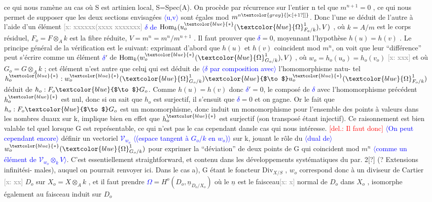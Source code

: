 \documentclass[11pt]{article}
\newcommand{\scanpage}[1]{\par\bigskip\noindent{\small\sffamily[scan #1]}\par}
\newcommand{\mspage}[1]{{\small\sffamily[p.\,#1]}}
\newcommand{\hand}[1]{\textcolor{blue}{#1}}
\let\over\relax
\newcommand{\over}[2]{\textcolor{gray}{#1}\textcolor{blue}{\ensuremath{^{\!\nearrow}}#2}}
\newcommand{\inserted}[2][]{\textcolor{blue}{$\langle$#2$\rangle$}}
\newcommand{\deleted}[1]{\textcolor{red}{[\textsf{del.:} #1]}}
\newcommand{\xout}[1]{\textcolor{gray}{[\textsf{x:} #1]}}
\newcommand{\uline}[1]{\underline{#1}}
\newcommand{\unsure}[1]{[#1?]}
\begin{document}
\mspage{129}

\clearpage
\scanpage{25/130}
\mspage{\hand{33}}

ce qui nous ramène au cas où S est artinien local, S=Spec(A). On procède
par récurrence sur l'entier n tel que $m^{n+1}=0$ , ce qui nous permet de
supposer que les deux sections envisagées \inserted{u,v} sont égales mod $m^{n\xout{\unsure{+1}}}$. Donc
l'une se déduit de l'autre à l'aide d'un élément \xout{xxxxxx(xxxx xxxxxxx} \hand{$\delta$ de}
$\mathrm{Hom}_k(u_o^{\hand{*}}(\hand{\Omega}^1_{F_o/k}), V)$ , où $k=A/m$ est le corps résiduel, $F_o=F\otimes_A k$ est la
fibre réduite, $V=m^n = m^n/m^{n+1}$ . Il faut prouver que \hand{$\delta$}$= 0$, moyennant
l'hypothèse $h(u)=h(v)$ . Le principe général de la vérification est le
suivant: exprimant d'abord que $h(u)$ et $h(v)$ coincident mod $m^n$, on voit
que leur ``différence'' peut s'écrire comme un élément \hand{$\delta$}$'$ de
$\mathrm{Hom}_k(w_o^{\hand{*}}(\hand{\Omega}^1_{G_o/k}),V)$ , où $w_o = h_o(u_o)=h_o(v_o)$ \xout{xxx} et où $G_o = G\otimes_A k$ ;
cet élément n'est autre que celu\uline{i} qui est déduit de \inserted[typed]{\hand{$\delta$} par composition avec} l'homomorphisme natu-%
tel $h_o^{\hand{*}} : w_o^{\hand{*}}(\hand{\Omega}^1_{G_o/k}) \hand{$\to$} u_o^{\hand{*}}(\hand{\Omega}^1_{F_o/k})$ déduit de $h_o: F_o\hand{$\to$} G_o$. Comme
$h(u)=h(v)$ donc \hand{$\delta$}$' = 0$, le composé de \hand{$\delta$} avec l'homomorphisme précédent
$h_o^{\hand{*}}$ est nul, donc si on sait que $h_o$ est surjectif, il s'ensuit que \hand{$\delta$}$=0$
et on gagne. Or le fait que $h_o:F_o\hand{$\to$} G_o$ est un monomorphisme, donc induit
un monomorphisme pour l'ensemble des points à valeurs dans les nombres
duaux sur k, implique bien en effet que $h_o^{\hand{*}}$ est surjectif (son transposé
étant injectif). Ce raisonnement est bien valable tel quel lorsque G
est représentable, ce qui n'est pas le cas cependant dansle cas qui nous
intéresse. \deleted{Il faut donc} \inserted{On peut cependant encore} définir un vectoriel \hand{$\mathcal{V}_{w_o}$} \inserted{(espace tangent à $G_o/k$ en $w_o$)} sur k, jouant le rôle
du \inserted{dual de} $w_o^{\hand{*}}(\hand{\Omega}^1_{G_o/k})$ pour exprimer la ``déviation'' de deux points de G qui
coincident mod $m^n$ \inserted{comme un élément de $\mathcal{V}_{w_o}\otimes_k V$}. C'est essentiellement straightforward, et contenu
dans les développements systématiques du par. 2\unsure{\over{5}{6}} (? Extensions infinitési-%
males), auquel on pourrait renvoyer ici. Dans le cas a), G étant le
foncteur $\mathrm{Div}_{X/S}$ , $w_o$ correspond donc à un diviseur de Cartier \xout{xx} $D_o$ sur
$X_o = X\otimes_A k$ , et il faut prendre \hand{$\Omega$}$= H^o(D_o, \underline{n}_{D_o/X_o})$ où le $\underline{n}$ est le
faisceau\xout{x} normal de $D_o$ dans $X_o$ , isomorphe également au faisceau induit
sur $D_o$
\end{document}
